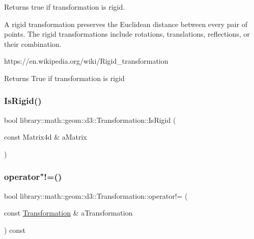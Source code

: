Returns true if transformation is rigid. 

A rigid transformation preserves the Euclidean distance between every pair of points. The rigid transformations include rotations, translations, reflections, or their combination.

https\+://en.wikipedia.\+org/wiki/\+Rigid\+\_\+transformation

\begin{DoxyReturn}{Returns}
True if transformation is rigid 
\end{DoxyReturn}
\mbox{\label{classlibrary_1_1math_1_1geom_1_1d3_1_1_transformation_aa37987be864c3bf60167721c5c41eabc}} 
\subsubsection{\texorpdfstring{Is\+Rigid()}{IsRigid()}}
{\footnotesize\ttfamily bool library\+::math\+::geom\+::d3\+::\+Transformation\+::\+Is\+Rigid (\begin{DoxyParamCaption}\item[{const Matrix4d \&}]{a\+Matrix }\end{DoxyParamCaption})\hspace{0.3cm}{\ttfamily [static]}}

\mbox{\label{classlibrary_1_1math_1_1geom_1_1d3_1_1_transformation_ac231beeb8ada73eada915903af7c56b1}} 
\subsubsection{\texorpdfstring{operator"!=()}{operator!=()}}
{\footnotesize\ttfamily bool library\+::math\+::geom\+::d3\+::\+Transformation\+::operator!= (\begin{DoxyParamCaption}\item[{const \hyperlink{classlibrary_1_1math_1_1geom_1_1d3_1_1_transformation}{Transformation} \&}]{a\+Transformation }\end{DoxyParamCaption}) const}

